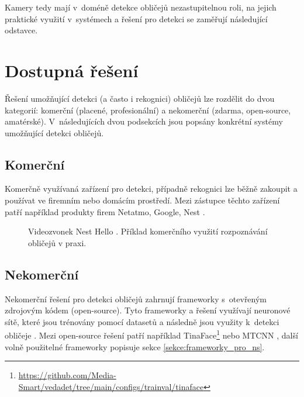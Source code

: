 Kamery tedy mají v~doméně detekce obličejů nezastupitelnou roli, na 
jejich praktické využití v~systémech a řešení pro detekci se zaměřují následující odstavce.

\section{Dostupná řešení}
Řešení umožňující detekci (a často i rekognici) obličejů lze rozdělit do dvou kategorií: 
komerční (placené, profesionální) a nekomerční (zdarma, open-source, amatérské).
V~následujících dvou podsekcích jsou popsány konkrétní systémy umožňující
detekci obličejů.

\subsection*{Komerční}
Komerčně využívaná zařízení pro detekci, případně rekognici lze běžně zakoupit 
a používat ve firemním nebo domácím prostředí. Mezi zástupce těchto zařízení
patří například produkty firem Netatmo, Google, Nest \cite{securityCamsWeb2}.

\begin{figure}[H]
  \begin{center}
  \label{nest}
  \caption{Videozvonek Nest Hello \cite{securityCamsWeb2}. Příklad komerčního využití rozpoznávání obličejů v praxi.}
  \end{center}
\end{figure}

\subsection*{Nekomerční}
Nekomerční řešení pro detekci obličejů zahrnují frameworky s~otevřeným zdrojovým
kódem (open-source). Tyto frameworky a řešení využívají neuronové sítě, které jsou trénovány
pomocí datasetů a následně jsou využity k~detekci obličeje 
\cite{faceRecognitionFrameworks}.
Mezi open-source řešení patří například TinaFace\footnote{\url{https://github.com/Media-Smart/vedadet/tree/main/configs/trainval/tinaface}} nebo MTCNN \cite{mtcnn}, další volně použitelné frameworky popisuje sekce \ref{sekce:frameworky_pro_ns}.


